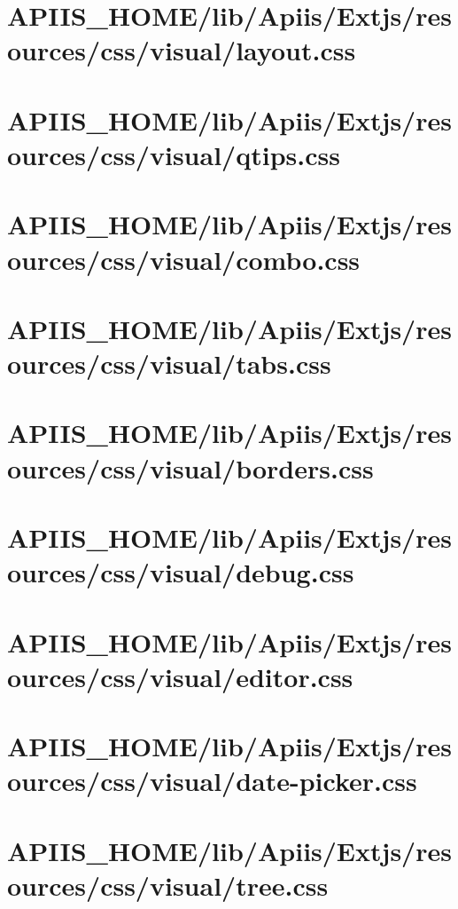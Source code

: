 \section{APIIS\_HOME/lib/Apiis/Extjs/resources/css/visual/layout.css} 
\section{APIIS\_HOME/lib/Apiis/Extjs/resources/css/visual/qtips.css} 
\section{APIIS\_HOME/lib/Apiis/Extjs/resources/css/visual/combo.css} 
\section{APIIS\_HOME/lib/Apiis/Extjs/resources/css/visual/tabs.css} 
\section{APIIS\_HOME/lib/Apiis/Extjs/resources/css/visual/borders.css} 
\section{APIIS\_HOME/lib/Apiis/Extjs/resources/css/visual/debug.css} 
\section{APIIS\_HOME/lib/Apiis/Extjs/resources/css/visual/editor.css} 
\section{APIIS\_HOME/lib/Apiis/Extjs/resources/css/visual/date-picker.css} 
\section{APIIS\_HOME/lib/Apiis/Extjs/resources/css/visual/tree.css} 
